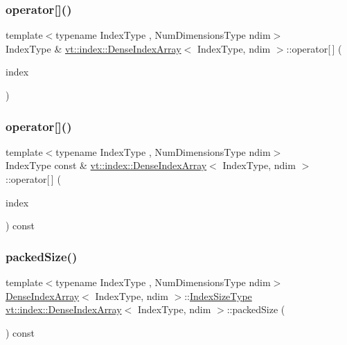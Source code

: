 \subsubsection{\texorpdfstring{operator[]()}{operator[]()}\hspace{0.1cm}{\footnotesize\ttfamily [1/2]}}
{\footnotesize\ttfamily template$<$typename Index\+Type , Num\+Dimensions\+Type ndim$>$ \\
Index\+Type \& \hyperlink{structvt_1_1index_1_1_dense_index_array}{vt\+::index\+::\+Dense\+Index\+Array}$<$ Index\+Type, ndim $>$\+::operator\mbox{[}$\,$\mbox{]} (\begin{DoxyParamCaption}\item[{Index\+Type const \&}]{index }\end{DoxyParamCaption})}

\mbox{\label{structvt_1_1index_1_1_dense_index_array_ac46f5310e8a39ad248ab55b71d60eac0}} 
\subsubsection{\texorpdfstring{operator[]()}{operator[]()}\hspace{0.1cm}{\footnotesize\ttfamily [2/2]}}
{\footnotesize\ttfamily template$<$typename Index\+Type , Num\+Dimensions\+Type ndim$>$ \\
Index\+Type const  \& \hyperlink{structvt_1_1index_1_1_dense_index_array}{vt\+::index\+::\+Dense\+Index\+Array}$<$ Index\+Type, ndim $>$\+::operator\mbox{[}$\,$\mbox{]} (\begin{DoxyParamCaption}\item[{Index\+Type const \&}]{index }\end{DoxyParamCaption}) const}

\mbox{\label{structvt_1_1index_1_1_dense_index_array_aaf03d65faf2c1916de7309f2602ee13a}} 
\subsubsection{\texorpdfstring{packed\+Size()}{packedSize()}}
{\footnotesize\ttfamily template$<$typename Index\+Type , Num\+Dimensions\+Type ndim$>$ \\
\hyperlink{structvt_1_1index_1_1_dense_index_array}{Dense\+Index\+Array}$<$ Index\+Type, ndim $>$\+::\hyperlink{structvt_1_1index_1_1_dense_index_array_ae2999552165f16fc69a2940e0589819f}{Index\+Size\+Type} \hyperlink{structvt_1_1index_1_1_dense_index_array}{vt\+::index\+::\+Dense\+Index\+Array}$<$ Index\+Type, ndim $>$\+::packed\+Size (\begin{DoxyParamCaption}{ }\end{DoxyParamCaption}) const}

